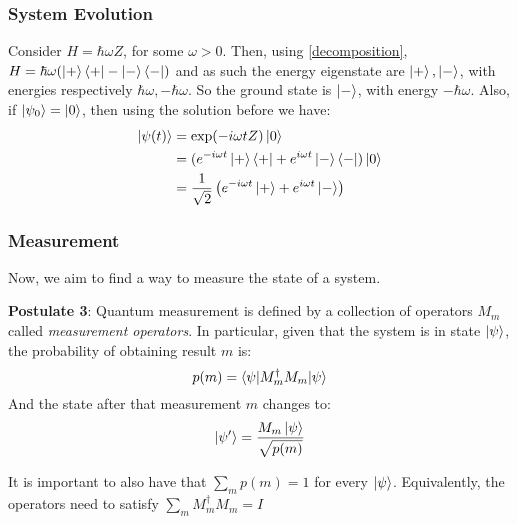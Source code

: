 \documentclass{beamer}
\begin{document}
    \begin{frame}
        \frametitle{System Evolution}
        \begin{example}
            Consider $H = \hbar \omega Z$, for some $\omega > 0$. Then, using \ref{decomposition}, $H = \hbar \omega (\ket{+}\bra{+} - \ket{-}\bra{-})$
            and as such the energy eigenstate are $\ket{+}, \ket{-}$, with energies respectively $\hbar \omega, -\hbar\omega$.
            So the ground state is $\ket{-}$, with energy $-\hbar\omega$.
            Also, if $\ket{\psi_0} = \ket{0}$, then using the solution before we have:
            \begin{align}
                \ket{\psi(t)} &= \exp(-i \omega t Z)\ket{0} \\
                &= (e^{-i \omega t} \ket{+}\bra{+} + e^{i \omega t} \ket{-}\bra{-})\ket{0} \\
                &= \frac{1}{\sqrt{2}} \left(e^{-i \omega t} \ket{+} + e^{i \omega t} \ket{-}\right) 
            \end{align}
        \end{example}
    \end{frame}
    \begin{frame}
        \frametitle{Measurement}
        Now, we aim to find a way to measure the state of a system.
        \begin{definition}
            \textbf{Postulate 3}: Quantum measurement is defined by a collection of operators
            ${M_m}$ called \textit{measurement operators}. In particular, given that the system is 
            in state $\ket{\psi}$, the probability of obtaining result $m$ is:
            \begin{equation}
                p(m) = \braket{\psi|M_m^\dagger M_m|\psi}
            \end{equation}
            And the state after that measurement $m$ changes to:
            \begin{equation}
                \ket{\psi'} = \frac{M_m \ket{\psi}}{\sqrt{p(m)}}
            \end{equation}
        \end{definition}
        It is important to also have that $\sum_m p(m) = 1$ for every $\ket{\psi}$. 
        Equivalently, the operators need to satisfy $\sum_m M_m^\dagger M_m = I$
    \end{frame}
\end{document}
